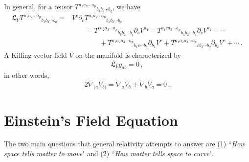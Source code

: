 \documentclass[11pt, onesided]{book}
\theoremstyle{break}
\theoremstyle{break}
\newcommand{\pd}{\partial}
\begin{document}
In general, for a tensor $T^{a_1a_2\cdots a_p}{}_{b_1b_2\cdots b_q} $, we have
\begin{align*}
\mathfrak{L}_VT^{a_1a_2\cdots a_p}{}_{b_1b_2\cdots b_q} 
= &V^c \pd_c T^{a_1a_2\cdots a_p}{}_{b_1b_2\cdots b_q} \\
&\qquad - T^{c a_2a_3\cdots a_p}{}_{b_1b_2\cdots b_q}\pd_c V^{a_1} - T^{ a_1 ca_3\cdots a_p}{}_{b_1b_2\cdots b_q}\pd_c V^{a_2} -\cdots \\
&\qquad\qquad + T^{a_1a_2a_3\cdots a_p}{}_{b_1 c\cdots b_q}\pd_{b_1} V^{c}+ T^{a_1a_2a_3\cdots a_p}{}_{cb_2\cdots b_q}\pd_{b_2} V^{c}+\cdots\,.
\end{align*}
A Killing vector field $V$ on the manifold is characterized by
\begin{align*}
\mathfrak{L}_V g_{ab} = 0\,,
\end{align*}
in other words,
\begin{align*}
2\nabla_{(a}V_{b)} = \nabla_a V_b + \nabla_b V_a = 0\,.
\end{align*}


\chapter{Einstein's Field Equation}
The two main questions that general relativity attempts to answer are (1) ``\textit{How space tells matter to move}" and (2) ``\textit{How matter tells space to curve}".\\
\end{document}
